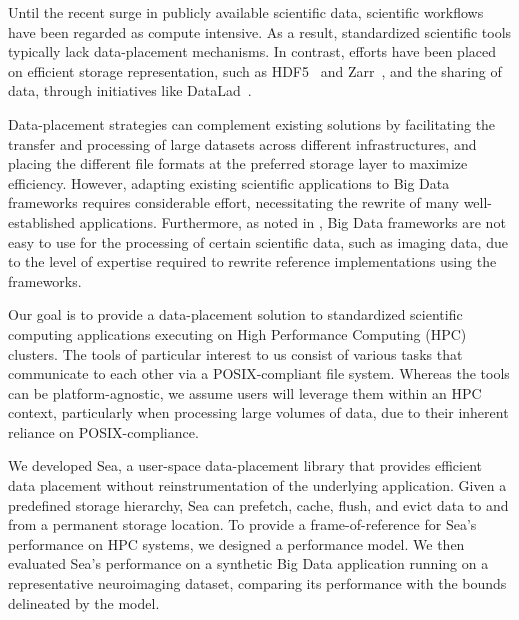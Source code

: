 \documentclass[10pt,journal,compsoc]{IEEEtran}
\begin{document}
Until the recent surge in publicly available scientific data, scientific
workflows have been regarded as compute intensive. As a result, standardized
scientific tools typically lack data-placement mechanisms. In contrast, efforts
have been placed on efficient storage representation, such as HDF5~\cite{hdf5}
and Zarr~\cite{zarr}, and the sharing of data, through initiatives like
DataLad~\cite{wagner2022fairly}.

Data-placement strategies can complement existing solutions by facilitating
the transfer and processing of large datasets across different
infrastructures, and placing the different file formats at the preferred
storage layer to maximize efficiency. However, adapting existing scientific
applications to Big Data frameworks requires considerable effort,
necessitating the rewrite of many well-established applications.
Furthermore, as noted in \cite{mehta2017comparative}, Big Data frameworks
are not easy to use for the processing of certain scientific data, such as
imaging data, due to the level of expertise required to rewrite reference
implementations using the frameworks.






Our goal is to provide a data-placement solution to standardized scientific
computing applications executing on High Performance Computing (HPC) clusters.
The tools of particular interest to us consist of various tasks that communicate
to each other via a POSIX-compliant file system. Whereas the tools can be
platform-agnostic, we assume users will leverage them within an HPC context,
particularly when processing large volumes of data, due to their inherent
reliance on POSIX-compliance.

We developed Sea, a user-space data-placement library that provides efficient
data placement without reinstrumentation of the underlying application. Given a
predefined storage hierarchy, Sea can prefetch, cache, flush, and evict data to
and from a permanent storage location. To provide a
frame-of-reference for Sea's performance on HPC systems, we designed a
performance model. We then evaluated Sea's performance on a synthetic Big Data
application running on a representative neuroimaging dataset, comparing its
performance with the bounds delineated by the model.
\end{document}
